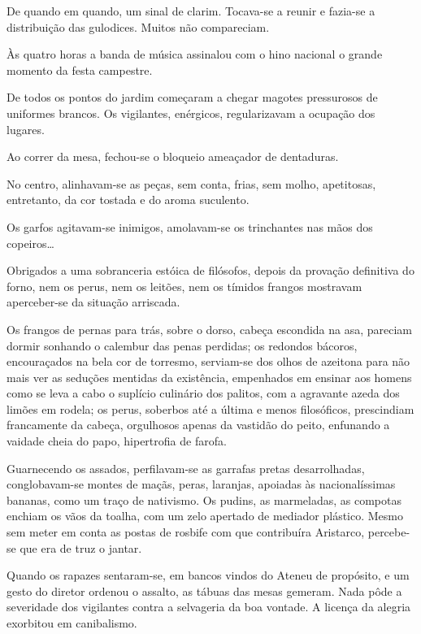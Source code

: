 De quando em quando, um sinal de clarim.
Tocava{}-se a reunir e fazia{}-se a distribuição das gulodices. Muitos
não compareciam. 

Às quatro horas a banda de música assinalou com o hino
nacional o grande momento da festa campestre. 

De todos os pontos do
jardim começaram a chegar magotes pressurosos de uniformes brancos. Os
vigilantes, enérgicos, regularizavam a ocupação dos lugares. 

Ao correr da mesa, fechou{}-se o bloqueio ameaçador de dentaduras. 

No centro, alinhavam{}-se as peças, sem conta, frias, sem molho, apetitosas,
entretanto, da cor tostada e do aroma suculento. 

Os garfos agitavam{}-se inimigos, amolavam{}-se os trinchantes nas mãos dos
copeiros\ldots 

Obrigados a uma sobranceria estóica de filósofos, depois da
provação definitiva do forno, nem os perus, nem os leitões, nem os
tímidos frangos mostravam aperceber{}-se da situação arriscada. 

Os frangos de pernas para trás, sobre o dorso, cabeça escondida na asa,
pareciam dormir sonhando o calembur das penas perdidas; os redondos
bácoros, encouraçados na bela cor de torresmo, serviam{}-se 
dos olhos de azeitona para não mais ver as seduções mentidas da
existência, empenhados em ensinar aos homens como se leva a cabo o
suplício culinário dos palitos, com a agravante azeda dos limões em
rodela; os perus, soberbos até a última e menos filosóficos,
prescindiam francamente da cabeça, orgulhosos apenas da vastidão do
peito, enfunando a vaidade cheia do papo, hipertrofia de farofa.

Guarnecendo os assados, perfilavam{}-se as garrafas pretas
desarrolhadas, conglobavam{}-se montes de maçãs, peras, laranjas,
apoiadas às nacionalíssimas bananas, como um traço de nativismo. Os
pudins, as marmeladas, as compotas enchiam os vãos da toalha, com um
zelo apertado de mediador plástico. Mesmo sem meter em conta as postas
de rosbife com que contribuíra Aristarco, percebe{}-se que era de truz
o jantar. 

Quando os rapazes sentaram{}-se, em bancos vindos do Ateneu
de propósito, e um gesto do diretor ordenou o assalto, as tábuas das
mesas gemeram. Nada pôde a severidade dos vigilantes contra a
selvageria da boa vontade. A licença da alegria exorbitou em
canibalismo. 

